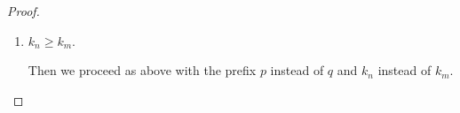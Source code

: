 \documentclass[10pt,a4paper]{article}
\begin{document}
\begin{proof}
\begin{enumerate}
Since $|q^{-k_s-1}|$ is odd by hypothesis, integrating two more times \eqref{eqx} we get the prefix $$q^{-k_s-2}d_{k_s+3}=q^{-k_s-2}\widetilde{w^{-2}}{u_S^{-2}}$$ where $u_S^{-2}$ is nonempty, so that $\widetilde{w^{-2}}$ is a prefix of $d_{k_s+3}$ (and does not coincide with it).
Since $|w^{-2}|>|w|\ge L_\epsilon$, by assumption the following inequalities are verified:
\begin{equation}
|f_{d_{k_s+3}}(1)-f_{\infty}(1)|<\epsilon
\label{comparings}
\end{equation}
\begin{equation}
|f_{w^{-2}}(1)-f_{\infty}(1)|<\epsilon
\label{comparing}
\end{equation}
%
 
and moreover, by hypothesis 3., $$|f_{\widetilde{w^{-2}}}(1)-f_{d_{k_n+3}}(1)|<\epsilon$$ Combining the last inequality with \eqref{comparings} and \eqref{comparing}, we get that the difference $|f_{\widetilde{w^{-2}}}(1)-f_{w^{-2}}(1)|$ is vanishingly small if $n$ is large enough, and therefore so is, by definition of mirror word, the difference $|f_{w^{-2}}(1)-f_{w^{-2}}(2)|$, from which    we can conclude.

\item $k_n\ge k_m$.

Then we proceed as above with the prefix $p$ instead of $q$ and $k_n$ instead of $k_m$.
\end{enumerate}
\end{proof}
\end{document}
